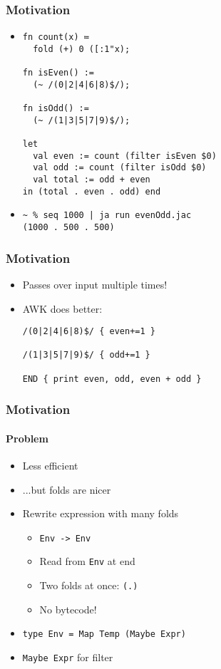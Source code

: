 \documentclass{beamer}
\begin{document}

\begin{frame}[fragile]
  \frametitle{Motivation}
  \begin{itemize}
    \item
      \begin{verbatim}
fn count(x) ≔
  fold (+) 0 ([:1"x);

fn isEven() :=
  (~ /(0|2|4|6|8)$/);

fn isOdd() :=
  (~ /(1|3|5|7|9)$/);

let
  val even := count (filter isEven $0)
  val odd := count (filter isOdd $0)
  val total := odd + even
in (total . even . odd) end
      \end{verbatim}
    \item
      \begin{verbatim}
~ % seq 1000 | ja run evenOdd.jac
(1000 . 500 . 500)
      \end{verbatim}
  \end{itemize}
\end{frame}
\begin{frame}[fragile]
  \frametitle{Motivation}
  \begin{itemize}
    \item Passes over input multiple times!
    \item AWK does better:
      \begin{verbatim}
/(0|2|4|6|8)$/ { even+=1 } 

/(1|3|5|7|9)$/ { odd+=1 } 

END { print even, odd, even + odd }
      \end{verbatim}
  \end{itemize}
\end{frame}

\begin{frame}[fragile]
  \frametitle{Motivation}
  \framesubtitle{Problem}
  \begin{itemize}
    \item Less efficient
    \item ...but folds are nicer
    \item Rewrite expression with many folds
      \begin{itemize}
        \item \verb|Env -> Env|
        \item Read from \verb|Env| at end
        \item Two folds at once: \verb|(.)|
        \item No bytecode!
      \end{itemize}
    \item
      \begin{verbatim}
type Env = Map Temp (Maybe Expr)
      \end{verbatim}
    \item \verb|Maybe Expr| for filter
  \end{itemize}
\end{frame}
\end{document}
